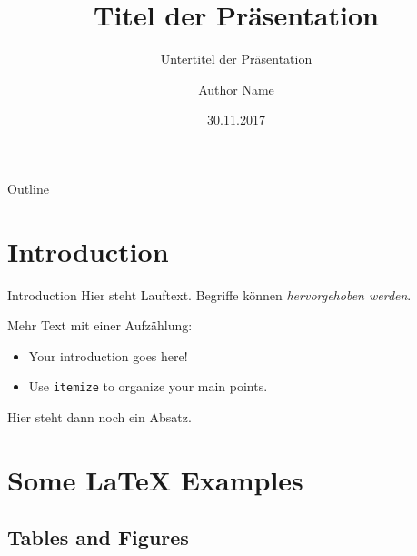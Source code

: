 \documentclass{beamer}
\begin{document}
\title[HAW Hamburg Beamer]{Titel der Präsentation}
\subtitle{Untertitel der Präsentation}
\author{Author Name}
\date{30.11.2017}

\begin{frame}
  \titlepage
\end{frame}

\begin{frame}{Outline}
  \tableofcontents
\end{frame}

\section{Introduction}

\begin{frame}{Introduction}
    Hier steht Lauftext. Begriffe können {\em hervorgehoben werden}.

    Mehr Text mit einer Aufzählung:
\begin{itemize}
  \item Your introduction goes here!
  \item Use \texttt{itemize} to organize your main points.
\end{itemize}

    Hier steht dann noch ein Absatz.

\end{frame}

\section{Some \LaTeX{} Examples}

\subsection{Tables and Figures}
\end{document}
